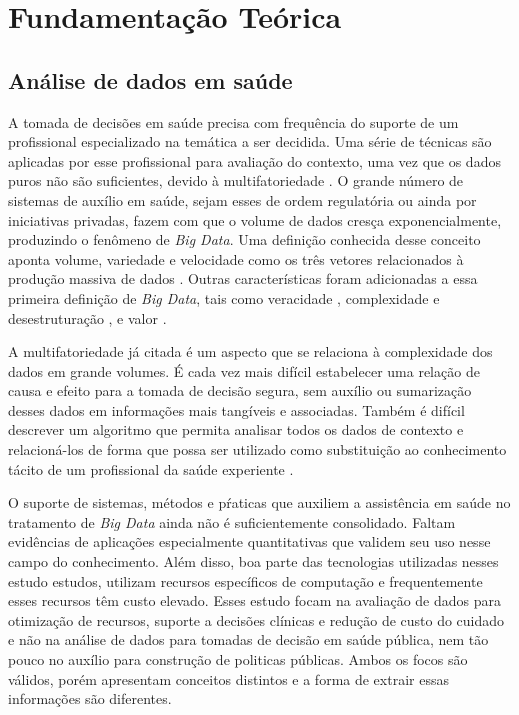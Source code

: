 
\chapter{Fundamentação Teórica}
\label{chap:fundamentacaoTeorica}

\section{Análise de dados em saúde}

A tomada de decisões em saúde precisa com frequência do suporte de um profissional especializado na temática a ser decidida. Uma série de técnicas são aplicadas por esse profissional para avaliação do contexto, uma vez que os dados puros não são suficientes, devido à multifatoriedade \cite{andrade_tomada_2008,resende2009}. O grande número de sistemas de auxílio em saúde, sejam esses de ordem regulatória ou ainda por iniciativas privadas, fazem com que o volume de dados cresça exponencialmente, produzindo o fenômeno de \emph{Big Data}. Uma definição conhecida desse conceito aponta volume, variedade e velocidade como os três vetores relacionados à produção massiva de dados \cite{laney20013d}. Outras características foram adicionadas a essa primeira definição de \emph{Big Data}, tais como veracidade \cite{schroeck2012analytics},  complexidade e desestruturação \cite{intel2012}, e valor \cite{oracle2013}.

A multifatoriedade já citada é um aspecto que se relaciona à complexidade dos dados em grande volumes. É cada vez mais difícil estabelecer uma relação de causa e efeito para a tomada de decisão segura, sem auxílio ou sumarização desses dados em informações mais tangíveis e associadas. Também é difícil descrever um algoritmo que permita analisar todos os dados de contexto e relacioná-los de forma que possa ser utilizado como substituição ao conhecimento tácito de um profissional da saúde experiente \cite{faceli2011}.

O suporte de sistemas, métodos e pŕaticas que auxiliem a assistência em saúde no tratamento de \emph{Big Data}  ainda não é suficientemente consolidado. Faltam evidências de aplicações especialmente quantitativas que validem seu uso nesse campo do conhecimento. Além disso, boa parte das tecnologias utilizadas nesses estudo estudos, utilizam recursos específicos de computação e frequentemente esses recursos têm custo elevado. Esses estudo focam na  avaliação de dados para otimização de recursos, suporte a decisões clínicas e redução de custo do cuidado \cite{nishita2018} e não na análise de dados para tomadas de decisão em saúde pública, nem tão pouco no auxílio para construção de politicas públicas. Ambos os focos são válidos, porém apresentam conceitos distintos e a forma de extrair essas informações são diferentes.

